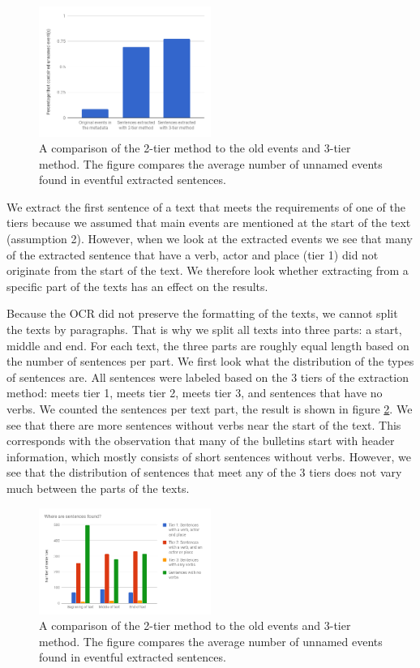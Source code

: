 \documentclass[a4paper, 10pt, conference]{ieeeconf}      %
\begin{document}
\begin{figure}
  \centering
  \includegraphics[width= 0.5\textwidth]{EventsPerSentence}
  \caption{A comparison of the 2-tier method to the old events and 3-tier method. The figure compares the average number of unnamed events found in eventful extracted sentences.}
  \label{events per sentence2}
\end{figure}

We extract the first sentence of a text that meets the requirements of one of the tiers because we assumed that main events are mentioned at the start of the text (assumption 2). However, when we look at the extracted events we see that many of the extracted sentence that have a verb, actor and place (tier 1) did not originate from the start of the text. We therefore look whether extracting from a specific part of the texts has an effect on the results.

Because the OCR did not preserve the formatting of the texts, we cannot split the texts by paragraphs. That is why we split all texts into three parts: a start, middle and end. For each text, the three parts are roughly equal length based on the number of sentences per part. We first look what the distribution of the types of sentences are. All sentences were labeled based on the 3 tiers of the extraction method: meets tier 1, meets tier 2, meets tier 3, and sentences that have no verbs. We counted the sentences per text part, the result is shown in figure \ref{sentence dist}. We see that there are more sentences without verbs near the start of the text. This corresponds with the observation that many of the bulletins start with header information, which mostly consists of short sentences without verbs. However, we see that the distribution of sentences that meet any of the 3 tiers does not vary much between the parts of the texts.

\begin{figure}
  \centering
  \includegraphics[width= 0.5\textwidth]{WhereAreSentencesFound}
  \caption{A comparison of the 2-tier method to the old events and 3-tier method. The figure compares the average number of unnamed events found in eventful extracted sentences.}
  \label{sentence dist}
\end{figure}
\end{document}
